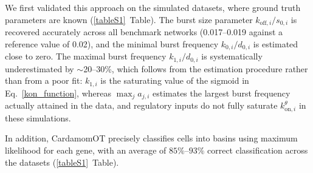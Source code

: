 \documentclass[a4paper, 11pt]{article}
\theoremstyle{plain}
\theoremstyle{remark}
\newcommand*{\firstreview}[1]{{\color{black}#1}}
\begin{document}
We first validated this approach on the simulated datasets, where ground truth parameters are
known (\ref{tableS1}~Table). \firstreview{The burst size parameter $k_{\mathrm{off},i}/s_{0,i}$
is recovered accurately across all benchmark networks (0.017--0.019 against a reference value of
0.02), and the minimal burst frequency $k_{0,i}/d_{0,i}$ is estimated close to zero. The maximal
burst frequency $k_{1,i}/d_{0,i}$ is systematically underestimated by $\sim$20--30\%, which
follows from the estimation procedure rather than from a poor fit: $k_{1,i}$ is the saturating
value of the sigmoid in Eq.~\eqref{kon_function}, whereas $\max_j a_{j,i}$ estimates the largest
burst frequency actually attained in the data, and regulatory inputs do not fully saturate
$k^{\theta}_{\mathrm{on},i}$ in these simulations.}

In addition, CardamomOT precisely classifies cells into basins using maximum likelihood for each
gene, with an average of $85\%$--$93\%$ correct classification across the datasets
(\ref{tableS1}~Table).
\end{document}
